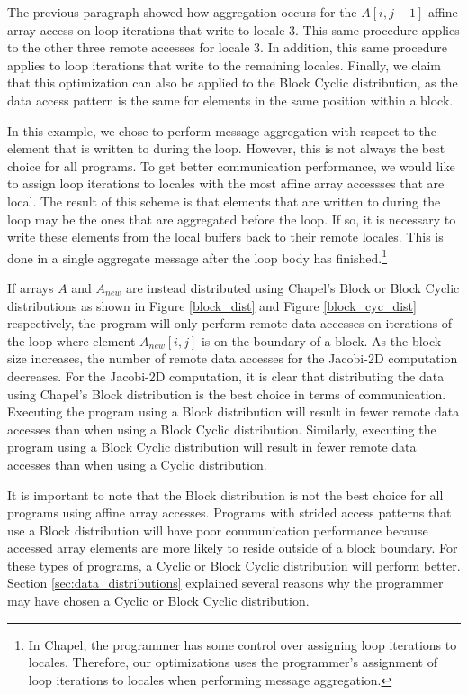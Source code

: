 The previous paragraph showed how aggregation occurs for the $A[i, j-1]$ affine array access on loop iterations that write to locale 3. This same procedure applies to the other three remote accesses for locale 3. In addition, this same procedure applies to loop iterations that write to the remaining locales. Finally, we claim that this optimization can also be applied to the Block Cyclic distribution, as the data access pattern is the same for elements in the same position within a block. 

In this example, we chose to perform message aggregation with respect to the element that is written to during the loop. However, this is not always the best choice for all programs. To get better communication performance, we would like to assign loop iterations to locales with the most affine array accessses that are local. The result of this scheme is that elements that are written to during the loop may be the ones that are aggregated before the loop. If so, it is necessary to write these elements from the local buffers back to their remote locales. This is done in a single aggregate message after the loop body has finished.\footnote{In Chapel, the programmer has some control over assigning loop iterations to locales. Therefore, our optimizations uses the programmer's assignment of loop iterations to locales when performing message aggregation.} 

If arrays $A$ and $A_{new}$ are instead distributed using Chapel's Block or Block Cyclic distributions as shown in Figure \ref{block_dist} and Figure \ref{block_cyc_dist} respectively, the program will only perform remote data accesses on iterations of the loop where element $A_{new}[i, j]$ is on the boundary of a block. As the block size increases, the number of remote data accesses for the Jacobi-2D computation decreases. For the Jacobi-2D computation, it is clear that distributing the data using Chapel's Block distribution is the best choice in terms of communication. Executing the program using a Block distribution will result in fewer remote data accesses than when using a Block Cyclic distribution. Similarly, executing the program using a Block Cyclic distribution will result in fewer remote data accesses than when using a Cyclic distribution. 

It is important to note that the Block distribution is not the best choice for all programs using affine array accesses. Programs with strided access patterns that use a Block distribution will have poor communication performance because accessed array elements are more likely to reside outside of a block boundary. For these types of programs, a Cyclic or Block Cyclic distribution will perform better. Section \ref{sec:data_distributions} explained several reasons why the programmer may have chosen a Cyclic or Block Cyclic distribution.

